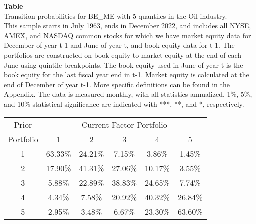 \begin{table*}[ht!]
\raggedright
{}
\label{tab: transition_probs_BE_ME_Oil_with_5_quantiles}
\textbf{Table \thetable} \\
Transition probabilities for BE_ME with 5 quantiles in the Oil industry. \\
\hspace*{1em}This sample starts in July 1963, ends in December 2022, and includes all NYSE, AMEX, and NASDAQ common stocks for which we have market equity data for December of year t-1 and June of year t, and book equity data for t-1. The portfolios are constructed on book equity to market equity at the end of each June using quintile breakpoints.  The book equity used in June of year t is the book equity for the last fiscal year end in t-1.  Market equity is calculated at the end of December of year t-1.  More specific definitions can be found in the Appendix.  The data is measured monthly, with all statistics annualized.  1\%, 5\%, and 10\% statistical significance are indicated with ***, **, and *, respectively. \\
\vspace{0.5em}
\centering
\begin{adjustbox}{max width=\textwidth}
\begin{tabular}{@{}cccccc@{}}
\toprule
Prior & \multicolumn{5}{c}{Current Factor Portfolio} \\
Portfolio & 1 & 2 & 3 & 4 & 5 \\
\midrule
1 & 63.33\% & 24.21\% & 7.15\% & 3.86\% & 1.45\% \\
2 & 17.90\% & 41.31\% & 27.06\% & 10.17\% & 3.55\% \\
3 & 5.88\% & 22.89\% & 38.83\% & 24.65\% & 7.74\% \\
4 & 4.34\% & 7.58\% & 20.92\% & 40.32\% & 26.84\% \\
5 & 2.95\% & 3.48\% & 6.67\% & 23.30\% & 63.60\% \\
\bottomrule
\end{tabular}
\end{adjustbox}
\end{table*}